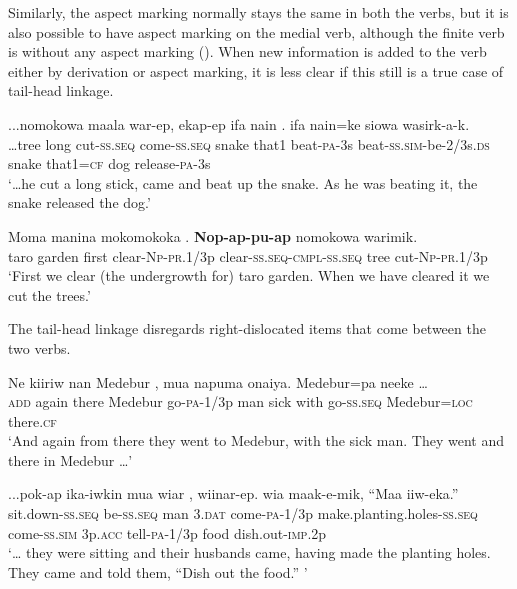  Similarly, the aspect marking normally stays the same in both the verbs, but it is also possible to have aspect marking on the medial verb, although the finite verb is without any aspect marking (). When new information is added to the verb either by derivation or aspect marking, it is less clear if this still is a true case of tail-head linkage.  

\ea%
\label{ex:x1516}
\gll ...nomokowa  maala  war-ep,  ekap-ep  ifa  nain .    ifa  nain=ke siowa  wasirk-a-k.\\
{\dots}tree  long  cut-\textsc{ss}.\textsc{seq} come-\textsc{ss}.\textsc{seq} snake  that1 beat-\textsc{pa}-3s beat-\textsc{ss}.\textsc{sim}-be-2/3s.\textsc{ds} snake  that1=\textsc{cf} dog  release-\textsc{pa}-3s\\
\glt`{\dots}he cut a long stick, came and beat up the snake. As he was beating it, the snake released the dog.'
\z


\ea%
\label{ex:x1517}
\gll Moma  manina  mokomokoka  \textstyleEmphasizedVernacularWords{-}\textstyleEmphasizedVernacularWords{-}. \textbf{Nop}\textbf{-}\textbf{ap-pu}\textbf{-}\textbf{ap}  nomokowa  warimik. \\
taro  garden  first  clear-\textsc{Np}-\textsc{pr}.1/3p clear-\textsc{ss}.\textsc{seq}-\textsc{cmpl}-\textsc{ss}.\textsc{seq} tree cut-\textsc{Np}-\textsc{pr}.1/3p     \\
\glt`First we clear (the undergrowth for) taro garden. When we have cleared it we cut the trees.'
\z
{}


The tail-head linkage disregards right-dislocated items that come between the two verbs. 

\ea%
\label{ex:x1518}
\gll Ne  kiiriw  nan  Medebur  ,  mua  napuma  onaiya.   Medebur=pa  neeke  {\dots}\\
\textsc{add} again  there  Medebur go-\textsc{pa}-1/3p  man  sick  with go-\textsc{ss}.\textsc{seq} Medebur=\textsc{loc} there.\textsc{cf}\\
\glt`And again from there they went to Medebur, with the sick man. They went and there in Medebur {\dots}'
\z


\ea%
\label{ex:x1519}
\gll ...pok-ap  ika-iwkin  mua  wiar  , wiinar-ep.    wia  maak-e-mik, ``Maa  iiw-eka.'' \\
sit.down-\textsc{ss}.\textsc{seq} be-\textsc{ss}.\textsc{seq} man  3.\textsc{dat} come-\textsc{pa}-1/3p make.planting.holes-\textsc{ss}.\textsc{seq} come-\textsc{ss}.\textsc{sim} 3p.\textsc{acc} tell-\textsc{pa}-1/3p food dish.out-\textsc{imp}.2p\\
\glt`{\dots} they were sitting and their husbands came, having made the planting holes. They came and told them, ``Dish out the food.'' '
\z



